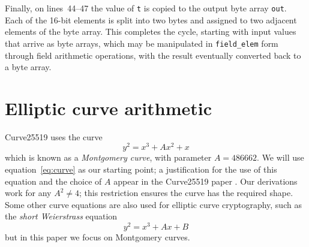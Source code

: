 \documentclass[manuscript]{acmart}
\begin{document}
Finally, on lines~44--47 the value of \verb|t| is copied to the output byte array \verb|out|.
Each of the 16-bit elements is split into two bytes and assigned to two adjacent elements of the byte array.
This completes the cycle, starting with input values that arrive as byte arrays, which may be manipulated in \verb|field_elem| form through field arithmetic operations, with the result eventually converted back to a byte array.

\section{Elliptic curve arithmetic}\label{sec:curve-arithmetic}

Curve25519 uses the curve
\begin{equation}\label{eq:curve}
y^2 = x^3 + A x^2 + x
\end{equation}
which is known as a \emph{Montgomery curve}, with parameter $A = 486662$.
We will use equation~\eqref{eq:curve} as our starting point; a justification for the use of this equation and the choice of $A$ appear in the Curve25519 paper \cite{Bernstein:2006kw}.
Our derivations work for any $A^2 \ne 4$; this restriction ensures the curve has the required shape.
Some other curve equations are also used for elliptic curve cryptography, such as the \emph{short Weierstrass} equation
\begin{equation}
y^2 = x^3 + Ax + B
\end{equation}
but in this paper we focus on Montgomery curves.
\end{document}
